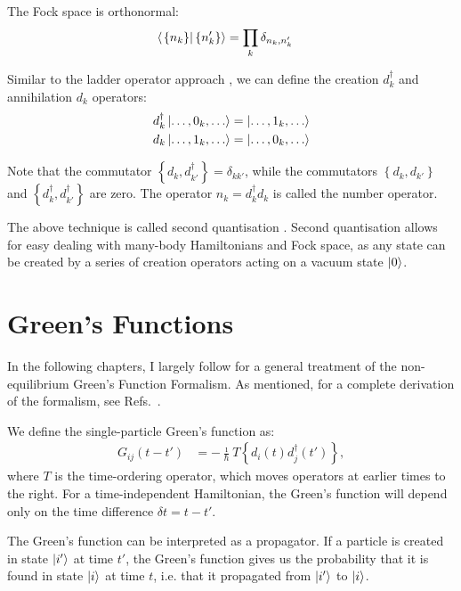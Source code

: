 The Fock space is orthonormal:
\begin{align*}
\braket{ \left. \left\{ n_k \right\} \right| \left\{ n_k' \right\}} &= \prod_{k} \delta_{n_k, n_k'}
\end{align*}

Similar to the ladder operator approach \cite{griffiths}, we can define the creation $d^\dagger_k$ and annihilation $d_k$ operators:
\begin{align*}
d_k^\dagger \ket{\ldots, 0_k, \ldots} &=\ket{\ldots, 1_k, \ldots}\\
d_k \ket{\ldots, 1_k, \ldots} &=\ket{\ldots, 0_k, \ldots}
\end{align*}

Note that the commutator $\left\{ d_k, d_{k'}^\dagger\right\} = \delta_{kk'}$, while the commutators $\left\{ d_k, d_{k'}\right\}$ and $\left\{ d_k^\dagger, d_{k'}^\dagger\right\}$ are zero. The operator $n_k = d_k^\dagger d_k$ is called the number operator. 

The above technique is called second quantisation \cite{yuli}. Second quantisation allows for easy dealing with many-body Hamiltonians and Fock space, as any state can be created by a series of creation operators acting on a vacuum state $\ket{0}$. 
 

\section{Green's Functions}
\label{sec:greensfunctions}
In the following chapters, I largely follow \citet{seldenthuis} for a general treatment of the non-equilibrium Green's Function Formalism. As mentioned, for a complete derivation of the formalism, see Refs.~\cite{mattuck,diventra,haugjauho}.

We define the single-particle Green's function as:
\begin{align}
G_{ij} (t-t') &= -\frac{\imath}{\hbar} T\left\{d_i(t)d_j^\dagger(t')\right\},
\label{eq:greensfunction}
\end{align}
where $T$ is the time-ordering operator, which moves operators at earlier times to the right. For a time-independent Hamiltonian, the Green's function will depend only on the time difference $\delta t = t - t'$. 

The Green's function can be interpreted as a propagator. If a particle is created in state $\ket{i'}$ at time $t'$, the Green's function gives us the probability that it is found in state $\ket{i}$ at time $t$, i.e. that it propagated from $\ket{i'}$ to $\ket{i}$.

